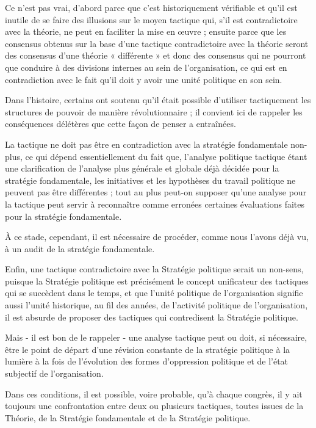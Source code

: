 Ce n'est pas vrai, d'abord parce que c'est historiquement vérifiable et qu'il est inutile de se faire des illusions sur le moyen tactique qui, s'il est contradictoire avec la théorie, ne peut en faciliter la mise en œuvre ; ensuite parce que les consensus obtenus sur la base d'une tactique contradictoire avec la théorie seront des consensus d'une théorie « différente » et donc des consensus qui ne pourront que conduire à des divisions internes au sein de l'organisation, ce qui est en contradiction avec le fait qu'il doit y avoir une unité politique en son sein.

Dans l'histoire, certains ont soutenu qu'il était possible d'utiliser tactiquement les structures de pouvoir de manière révolutionnaire ; il convient ici de rappeler les conséquences délétères que cette façon de penser a entraînées.

La tactique ne doit pas être en contradiction avec la stratégie fondamentale  non-plus, ce qui dépend essentiellement du fait que, l'analyse politique tactique étant une clarification de l'analyse plus générale et globale déjà décidée pour la stratégie fondamentale, les initiatives et les hypothèses du travail politique ne peuvent pas être différentes ; tout au plus peut-on supposer qu'une analyse pour la tactique peut servir à reconnaître comme erronées certaines évaluations faites pour la stratégie fondamentale.

À ce stade, cependant, il est nécessaire de procéder, comme nous l'avons déjà vu, à un audit de la stratégie fondamentale.

Enfin, une tactique contradictoire avec la Stratégie politique serait un non-sens, puisque la Stratégie politique est précisément le concept unificateur des tactiques qui se succèdent dans le temps, et que l'unité politique de l'organisation signifie aussi l'unité historique, au fil des années, de l'activité politique de l'organisation, il est absurde de proposer des tactiques qui contredisent la Stratégie politique.

Mais - il est bon de le rappeler - une analyse tactique peut ou doit, si nécessaire, être le point de départ d'une révision constante de la stratégie politique à la lumière à la fois de l'évolution des formes d'oppression politique et de l'état subjectif de l'organisation.

Dans ces conditions, il est possible, voire probable, qu'à chaque congrès, il y ait toujours une confrontation entre deux ou plusieurs tactiques, toutes issues de la Théorie, de la Stratégie fondamentale et de la Stratégie politique.

